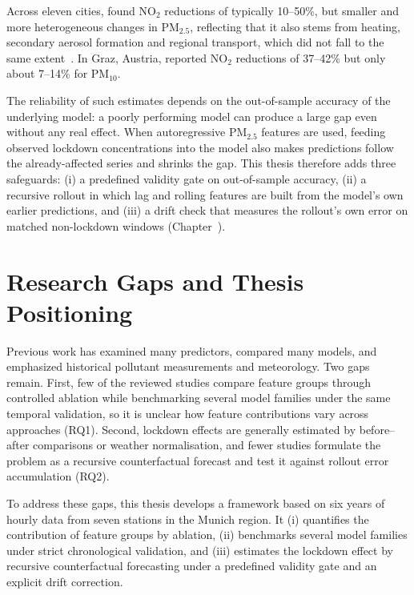 Across eleven cities, \textcite{shi2021} found NO$_2$ reductions of typically 10--50\%, but smaller and more heterogeneous changes in PM$_{2.5}$, reflecting that it also stems from heating, secondary aerosol formation and regional transport, which did not fall to the same extent~\parencite{shi2021, cordero2022}. In Graz, Austria, \textcite{lovrić2020} reported NO$_2$ reductions of 37--42\% but only about 7--14\% for PM$_{10}$.

The reliability of such estimates depends on the out-of-sample accuracy of the underlying model: a poorly performing model can produce a large gap even without any real effect. When autoregressive PM$_{2.5}$ features are used, feeding observed lockdown concentrations into the model also makes predictions follow the already-affected series and shrinks the gap. This thesis therefore adds three safeguards: (i) a predefined validity gate on out-of-sample accuracy, (ii) a recursive rollout in which lag and rolling features are built from the model's own earlier predictions, and (iii) a drift check that measures the rollout's own error on matched non-lockdown windows (Chapter~).

\section{Research Gaps and Thesis Positioning}
Previous work has examined many predictors, compared many models, and emphasized historical pollutant measurements and meteorology. Two gaps remain. First, few of the reviewed studies compare feature groups through controlled ablation while benchmarking several model families under the same temporal validation, so it is unclear how feature contributions vary across approaches (RQ1). Second, lockdown effects are generally estimated by before--after comparisons or weather normalisation, and fewer studies formulate the problem as a recursive counterfactual forecast and test it against rollout error accumulation (RQ2).

To address these gaps, this thesis develops a framework based on six years of hourly data from seven stations in the Munich region. It (i) quantifies the contribution of feature groups by ablation, (ii) benchmarks several model families under strict chronological validation, and (iii) estimates the lockdown effect by recursive counterfactual forecasting under a predefined validity gate and an explicit drift correction.
